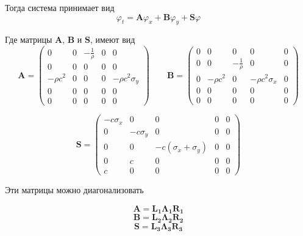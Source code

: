 Тогда система принимает вид
\begin{equation}
    \varphi_t = \bm{A}\varphi_x + \bm{B}\varphi_y + \bm{S}\varphi
\end{equation}

Где матрицы $\bm{A}$, $\bm{B}$ и $\bm{S}$, имеют вид
\begin{equation*}
    \bm{A} = \begin{pmatrix}
        0 & 0 & -\frac{1}{\rho} & 0 & 0 \\
        0 & 0 & 0 & 0 & 0 \\
        -\rho c^2 & 0 & 0 & 0 & -\rho c^2 \sigma_y \\
        0 & 0 & 0 & 0 & 0 \\
        0 & 0 & 0 & 0 & 0
    \end{pmatrix} \qquad
	\bm{B} = \begin{pmatrix}
        0 & 0 & 0 & 0 & 0 \\
        0 & 0 & -\frac{1}{\rho} & 0 & 0 \\
        0 & -\rho c^2  & 0 & -\rho c^2 \sigma_x & 0 \\
        0 & 0 & 0 & 0 & 0 \\
        0 & 0 & 0 & 0 & 0
    \end{pmatrix}
\end{equation*}
    
\begin{equation*}
	\bm{S} = \begin{pmatrix}
        -c \sigma_x & 0 & 0 & 0 & 0 \\
        0 & -c \sigma_y & 0 & 0 & 0 \\
        0 & 0 & -c (\sigma_x + \sigma_y) & 0 & 0 \\
        0 & c & 0 & 0 & 0 \\
        c & 0 & 0 & 0 & 0
    \end{pmatrix}
\end{equation*}

Эти матрицы можно диагонализовать

\begin{equation*}
    \bm{A} = \bm{L_1} \bm{\Lambda_1} \bm{R_1}
\end{equation*}
\begin{equation*}
    \bm{B} = \bm{L_2} \bm{\Lambda_2} \bm{R_2}
\end{equation*}
\begin{equation*}
    \bm{S} =\bm{L_3} \bm{\Lambda_3} \bm{R_3}
\end{equation*}


